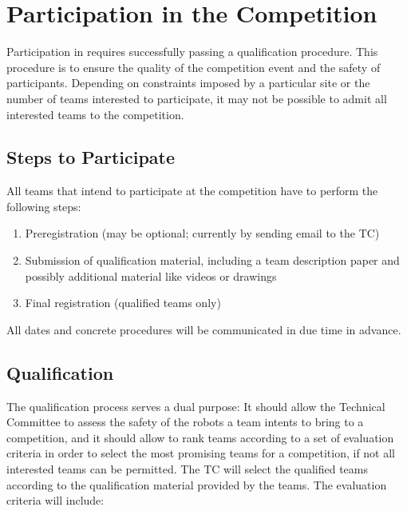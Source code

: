 \section{Participation in the Competition}\label{sec:participation_in_the_competition}
Participation in \RCAW requires successfully passing a qualification procedure. This procedure is to ensure the quality of the competition event and the safety of participants. Depending on constraints imposed by a particular site or the number of teams interested to participate, it may not be possible to admit all interested teams to the competition.
 
\subsection{Steps to Participate}
All teams that intend to participate at the competition have to perform the following steps:

\begin{enumerate}
	\item Preregistration (may be optional; currently by sending email to the TC)
	\item Submission of qualification material, including a team description 				paper and possibly additional material like videos or drawings
	\item Final registration (qualified teams only)
\end{enumerate}


All dates and concrete procedures will be communicated in due time in advance.

\subsection{Qualification}
The qualification process serves a dual purpose: It should allow the Technical Committee to assess the safety of the robots a team intents to bring to a competition, and it should allow to rank teams according to a set of evaluation criteria in order to select the most promising teams for a competition, if not all interested teams can be permitted. The TC will select the qualified teams according to the qualification material provided by the teams. The evaluation criteria will include:

